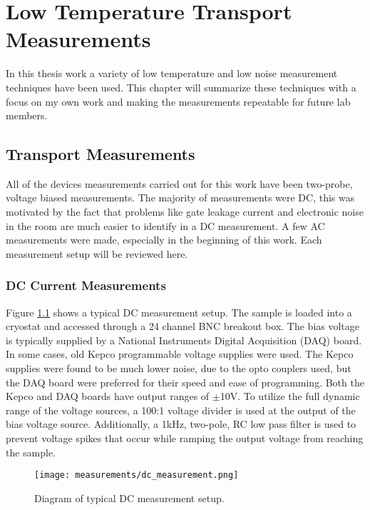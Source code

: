 \chapter{Low Temperature Transport Measurements}
\label{sec:measurement}

In this thesis work a variety of low temperature and low noise measurement techniques have been used. This chapter will summarize these techniques with a focus on my own work and making the measurements repeatable for future lab members. 

\section{Transport Measurements}

All of the devices measurements carried out for this work have been two-probe, voltage biased measurements. The majority of measurements were DC, this was motivated by the fact that problems like gate leakage current and electronic noise in the room are much easier to identify in a DC measurement. A few AC measurements were made, especially in the beginning of this work. Each measurement setup will be reviewed here.

\subsection{DC Current Measurements}
\label{sec:DC}

Figure \ref{fig:dc_measurement} shows a typical DC measurement setup. The sample is loaded into a cryostat and accessed through a 24 channel BNC breakout box. The bias voltage is typically supplied by a National Instruments Digital Acquisition (DAQ) board. In some cases, old Kepco programmable voltage supplies were used. The Kepco supplies were found to be much lower noise, due to the opto couplers used, but the DAQ board were preferred for their speed and ease of programming. Both the Kepco and DAQ boards have output ranges of $\pm$10V. To utilize the full dynamic range of the voltage sources, a 100:1 voltage divider is used at the output of the bias voltage source. Additionally, a 1kHz, two-pole, RC low pass filter is used to prevent voltage spikes that occur while ramping the output voltage from reaching the sample.

\begin{figure}
    \centering
    \texttt{[image: measurements/dc\_measurement.png]}
    \caption{Diagram of typical DC measurement setup.}
    \label{fig:dc_measurement}
\end{figure}

